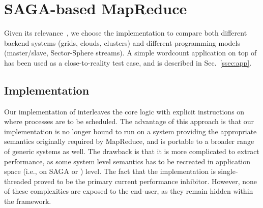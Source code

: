 \documentclass[3p,twocolumn]{elsarticle}
\begin{document}
\section{SAGA-based MapReduce}
\label{sec:mr}

 Given its relevance~\cite{saga_ccgrid09}, we choose the \smr
 implementation to compare both different backend systems (grids,
 clouds, clusters) and different programming models (master/slave,
 Sector-Sphere streams).  A simple wordcount application on top of
 \smr has been used as a close-to-reality test case, and is
 described in Sec.~\ref{ssec:app}.


\subsection{\sagamapreduce Implementation}


Our implementation of \sagamapreduce interleaves the core \MR logic
with explicit instructions on where processes are to be scheduled.
The advantage of this approach is that our implementation is no longer
bound to run on a system providing the appropriate semantics
originally required by MapReduce, and is portable to a broader range
of generic systems as well.  The drawback is that it is more
complicated to extract performance, as some system level semantics has
to be recreated in application space (i.e., on SAGA or \smr) level.
The fact that the implementation is single-threaded proved to be the
primary current performance inhibitor.  However, none of these
complexities are exposed to the end-user, as they remain hidden within
the framework. 

\end{document}
